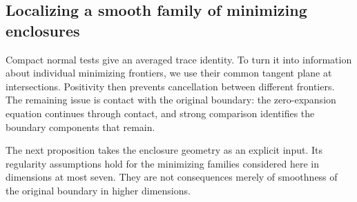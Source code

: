 \subsection{Localizing a smooth family of minimizing enclosures}

Compact normal tests give an averaged trace identity. To turn it into
information about individual minimizing frontiers, we use their common
tangent plane at intersections. Positivity then prevents cancellation
between different frontiers. The remaining issue is contact with the
original boundary: the zero-expansion equation continues through contact,
and strong comparison identifies the boundary components that remain.

The next proposition takes the enclosure geometry as an explicit input.
Its regularity assumptions hold for the minimizing families considered
here in dimensions at most seven. They are not consequences merely of
smoothness of the original boundary in higher dimensions.

